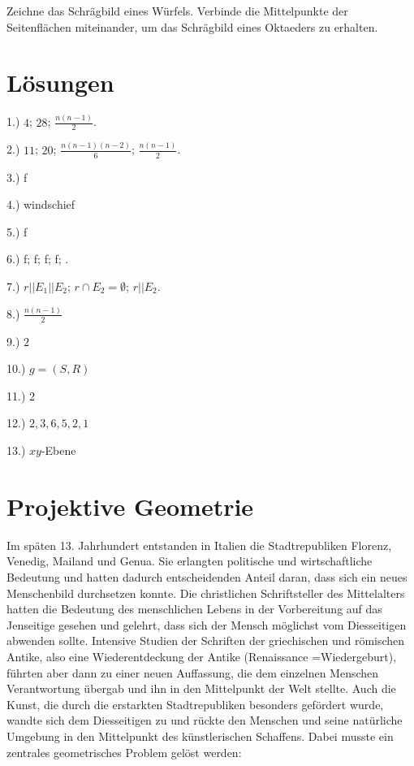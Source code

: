 \documentclass[%
11pt,%
twoside,%
titlepage,%
a4page,%
german,%
headsepline%
]{scrartcl}
\begin{document}
\begin{ueb}
Zeichne das Schr\"agbild eines W\"urfels. Verbinde die Mittelpunkte der Seitenfl\"achen miteinander, um das Schr\"agbild eines Oktaeders zu erhalten.
\end{ueb}

\section*{L\"osungen}

1.) $4$; $28$; $\frac{n(n-1)}{2}$.

2.) $11$; $20$; $\frac{n(n-1)(n-2)}{6}$; $\frac{n(n-1)}{2}$.

3.) f

4.) windschief

5.) f

6.) f; f; f; f; \checkmark.

7.) $r||E_1||E_2$; $r\cap E_2=\emptyset$; $r||E_2$.

8.) $\frac{n(n-1)}{2}$

9.) $2$

10.) $g=(S,R)$

11.) $2$

12.) $2,3,6,5,2,1$

13.) $xy$-Ebene

\clearpage

\section{Projektive Geometrie}
Im sp\"aten 13. Jahrhundert entstanden in Italien die Stadtrepubliken Florenz, Venedig, Mailand und Genua. Sie erlangten politische und wirtschaftliche Bedeutung und hatten dadurch entscheidenden Anteil daran, dass sich ein neues Menschenbild durchsetzen konnte. Die christlichen Schriftsteller des Mittelalters hatten die Bedeutung des menschlichen Lebens in der Vorbereitung auf das Jenseitige gesehen und gelehrt, dass sich der Mensch m\"oglichst vom Diesseitigen abwenden sollte. Intensive Studien der Schriften der griechischen und r\"omischen Antike, also eine Wiederentdeckung der Antike (Renaissance =Wiedergeburt), f\"uhrten aber dann zu einer neuen Auffassung, die dem einzelnen Menschen Verantwortung \"ubergab und ihn in den Mittelpunkt der Welt stellte. Auch die Kunst, die durch die erstarkten Stadtrepubliken besonders gef\"ordert wurde, wandte sich dem Diesseitigen zu und r\"uckte den Menschen und seine nat\"urliche Umgebung in den Mittelpunkt des k\"unstlerischen Schaffens. Dabei musste ein zentrales geometrisches Problem gel\"ost werden:
\end{document}
